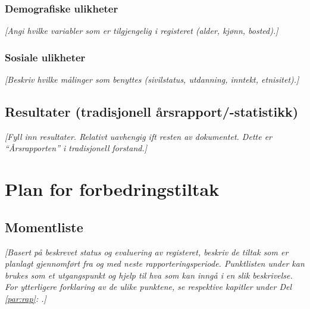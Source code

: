 \documentclass[norsk, a4paper, twocolumn]{report}
\newcommand{\guide}[1] {
	\textit{[\textcolor{guidegray}{#1}]}
	}
\begin{document}
\section{Demografiske ulikheter}\label{sec:demuli}
\guide{Angi hvilke variabler som er tilgjengelig i registeret (alder, kjønn,
bosted).}

\section{Sosiale ulikheter}\label{sec:sosuli}
\guide{Beskriv hvilke målinger som benyttes (sivilstatus, utdanning, inntekt,
etnisitet).}


\chapter{Resultater (tradisjonell årsrapport/-statistikk)}\label{part:res}
\guide{Fyll inn resultater. Relativt uavhengig ift resten av dokumentet. Dette er ``Årsrapporten'' i tradisjonell forstand.}




\onecolumn
\part{Plan for forbedringstiltak}
\chapter{Momentliste}
\guide{Basert på beskrevet status og evaluering av registeret, beskriv de
tiltak som er planlagt gjennomført fra og med neste rapporteringsperiode.
Punktlisten under kan brukes som et utgangspunkt og hjelp til hva som kan
inngå i en slik beskrivelse. For ytterligere forklaring av de ulike punktene,
se respektive kapitler under Del \ref{par:rap}: \nameref{par:rap}.}
\end{document}
